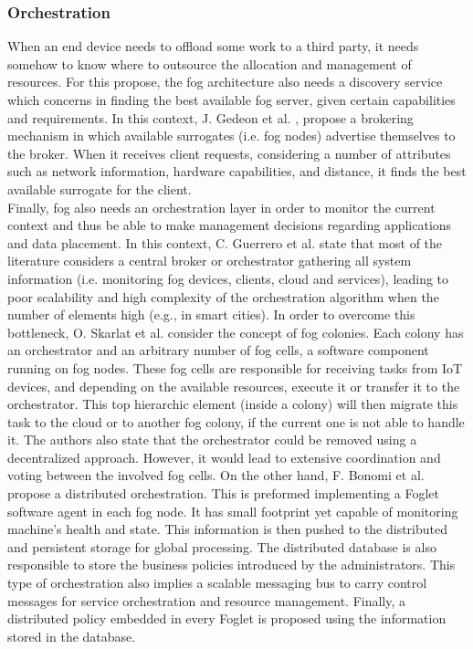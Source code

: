 \subsubsection{Orchestration}
\noindent\tab When an end device needs to offload some work to a third party, it needs somehow to know where to outsource the allocation and management of resources. For this propose, the fog architecture also needs a discovery service which concerns in finding the best available fog server, given certain capabilities and requirements. In this context, J. Gedeon et al. \cite{gedeon2017router}, propose a brokering mechanism in which available surrogates (i.e. fog nodes) advertise themselves to the broker. When it receives client requests, considering a number of attributes such as network information, hardware capabilities, and distance, it finds the best available surrogate for the client.\\
\noindent\tab Finally, fog also needs an orchestration layer in order to monitor the current context and thus be able to make management decisions regarding applications and data placement. In this context, C. Guerrero et al. \cite{guerrero2018influence} state that most of the literature considers a central broker or orchestrator gathering all system information (i.e. monitoring fog devices, clients, cloud and services), leading to poor scalability and high complexity of the orchestration algorithm when the number of elements high (e.g., in smart cities). In order to overcome this bottleneck, O. Skarlat et al. \cite{skarlat2016resource,skarlat2017optimized} consider the concept of fog colonies. Each colony has an orchestrator and an arbitrary number of fog cells, a software component running on fog nodes. These fog cells are responsible for receiving tasks from IoT devices, and depending on the available resources, execute it or transfer it to the orchestrator. This top hierarchic element (inside a colony) will then migrate this task to the cloud or to another fog colony, if the current one is not able to handle it. The authors also state that the orchestrator could be removed using a decentralized approach. However, it would lead to extensive coordination and voting between the involved fog cells. On the other hand, F. Bonomi et al. \cite{bonomi2014fog} propose a distributed orchestration. This is preformed implementing a Foglet software agent in each fog node. It has small footprint yet capable of monitoring machine's health and state. This information is then pushed to the distributed and persistent storage for global processing. The distributed database is also responsible to store the business policies introduced by the administrators. This type of orchestration also implies a scalable messaging bus to carry control messages for service orchestration and resource management. Finally, a distributed policy embedded in every Foglet is proposed using the information stored in the database.\\
